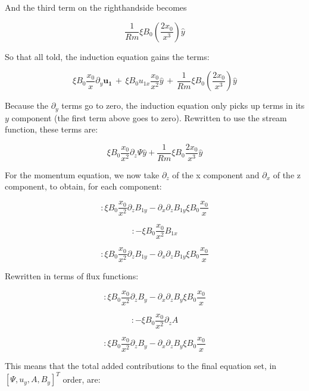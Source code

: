 \documentclass[letterpaper,12pt]{article}
\newcommand{\beq}{\begin{equation}}
\newcommand{\eeq}{\end{equation}}
\newcommand\reym{\mathrel{Rm}}
\begin{document}
And the third term on the righthandside becomes

\beq
\frac{1}{\reym} \xi B_0 \left( \frac{2 x_0}{x^3}\right) \hat{y}
\eeq

So that all told, the induction equation gains the terms:

\beq
\xi B_0 \frac{x_0}{x} \partial_y \mathbf{u_1} \, + \, \xi B_0 u_{1x} \frac{x_0}{x^2} \hat{y} \, + \, \frac{1}{\reym} \xi B_0 \left( \frac{2 x_0}{x^3}\right) \hat{y}
\eeq

Because the $\partial_y$ terms go to zero, the induction equation only picks up terms in its $y$ component (the first term above goes to zero). Rewritten to use the stream function, these terms are:

\beq
\label{induc_eq_added}
\xi B_0 \frac{x_0}{x^2} \partial_z \Psi \hat{y} + \frac{1}{\reym} \xi B_0 \frac{2 x_0}{x^3} \hat{y}
\eeq 


For the momentum equation, we now take $\partial_z$ of the x component and $\partial_x$ of the z component, to obtain, for each component:

\beq
[x]: \xi B_0 \frac{x_0}{x^2} \partial_z B_{1y} - \partial_x\partial_z B_{1y} \xi B_0 \frac{x_0}{x}
\eeq

\beq
[y]: - \xi B_0 \frac{x_0}{x^2} B_{1x}
\eeq

\beq
[z]: \xi B_0 \frac{x_0}{x^2} \partial_z B_{1y} - \partial_x\partial_z B_{1y} \xi B_0 \frac{x_0}{x}
\eeq

Rewritten in terms of flux functions:

\beq
[x]: \xi B_0 \frac{x_0}{x^2} \partial_z B_{y} - \partial_x\partial_z B_{y} \xi B_0 \frac{x_0}{x}
\eeq

\beq
[y]: - \xi B_0 \frac{x_0}{x^2} \partial_z A
\eeq

\beq
[z]: \xi B_0 \frac{x_0}{x^2} \partial_z B_{y} - \partial_x\partial_z B_{y} \xi B_0 \frac{x_0}{x}
\eeq

This means that the total added contributions to the final equation set, in $\left[\Psi, u_y, A, B_y\right]^T$ order, are:
\end{document}
